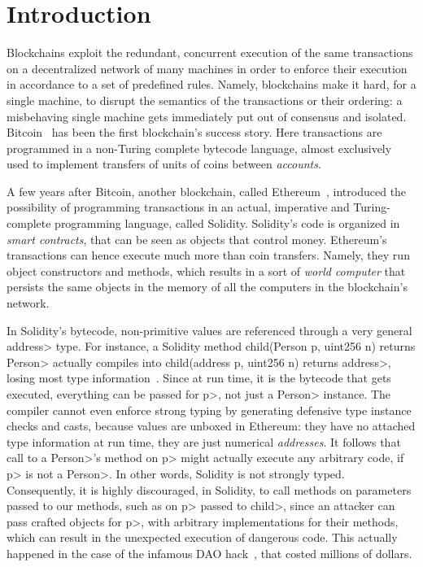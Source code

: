\section{Introduction}\label{sec:introduction}

Blockchains exploit the redundant, concurrent execution of the same
transactions on a decentralized network of many machines
in order to enforce their execution in accordance to
a set of predefined rules. Namely, blockchains make it hard, for a single machine,
to disrupt the semantics of the transactions or their ordering: a misbehaving single machine
gets immediately put out of consensus and isolated. Bitcoin~\cite{Nakamoto08,book-mastering-bitcoin}
has been the first blockchain's success story. Here
transactions are programmed in a non-Turing complete bytecode language,
almost exclusively used to implement transfers of units of coins between \emph{accounts}.

A few years after Bitcoin, another blockchain, called
Ethereum~\cite{Buterin13,AntonopoulosW18}, introduced the possibility of programming
transactions in an actual, imperative and Turing-complete programming language, called Solidity.
Solidity's code is organized in \emph{smart contracts}, that can be seen as
objects that control money. 
Ethereum's transactions can hence execute much more than coin transfers. Namely,
they run object constructors and methods, which results in a sort
of \emph{world computer} that persists the same objects in the memory of all the
computers in the blockchain's network.

In Solidity's bytecode,
non-primitive values are referenced through a very general
\<address> type. For instance, a Solidity method
\<child(Person p, uint256 n) returns Person> actually compiles
into \<child(address p, uint256 n) returns address>, losing most
type information~\cite{CrafaPZ19}.
Since at run time, it is the bytecode that gets executed, everything can be passed for \<p>, not just a \<Person> instance.
The compiler cannot even enforce strong typing
by generating defensive type instance checks and casts, because
values are unboxed in Ethereum: they have no attached
type information at run time,
they are just numerical \emph{addresses}.
It follows that  call to a \<Person>'s method
on \<p> might actually execute any arbitrary code, if \<p> is not a \<Person>.
In other words, Solidity is not strongly typed.
Consequently, it is highly discouraged, in Solidity, to call methods on parameters passed
to our methods, such as on \<p> passed to \<child>, since an attacker can pass crafted
objects for \<p>, with arbitrary implementations for their methods,
which can result in the unexpected execution of
dangerous code. This actually happened in the case of the infamous DAO hack~\cite{dao16}, that
costed millions of dollars.

